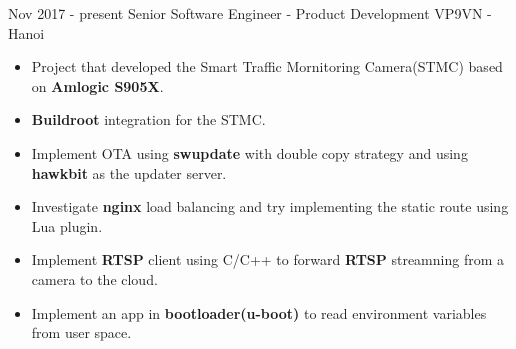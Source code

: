 \documentclass[letterpaper]{twentysecondcv} %
\begin{document}
\begin{twenty} %
	\twentyitem
		{Nov 2017 -}
		{present}
		{Senior Software Engineer - Product Development}
		{VP9VN - Hanoi}
		{}
		{\begin{itemize}
		\item Project that developed the Smart Traffic Mornitoring Camera(STMC) based on \textbf{Amlogic S905X}.
		\item \textbf{Buildroot} integration for the STMC.
		\item Implement OTA using \textbf{swupdate} with double copy strategy and using \textbf{hawkbit} as the updater server.
		\item Investigate \textbf{nginx} load balancing and try implementing the static route using Lua plugin.
		\item Implement \textbf{RTSP} client using C/C++ to forward \textbf{RTSP} streamning from a camera to the cloud.
		\item Implement an app in \textbf{bootloader(u-boot)} to read environment variables from user space.
		\end{itemize}}


\end{twenty}
\end{document}
